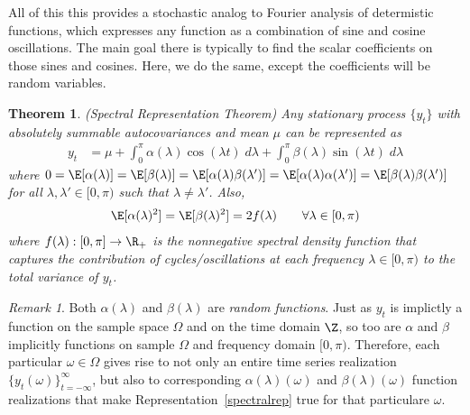 \documentclass[12pt]{article}
\theoremstyle{plain}
\newtheorem{thm}{Theorem}[section]
\theoremstyle{definition}
\theoremstyle{remark}
\newtheorem*{rmk}{Remark}
\newcommand{\ra}{\rightarrow}
\begin{document}
All of this this provides a stochastic analog to Fourier analysis of
determistic functions, which expresses any function as a combination of
sine and cosine oscillations. The main goal there is typically to find
the scalar coefficients on those sines and cosines. Here, we do the
same, except the coefficients will be random variables.

\begin{thm}\emph{(Spectral Representation Theorem)}
Any stationary process $\{y_t\}$ with absolutely summable
autocovariances and mean $\mu$ can be represented as
\begin{align}
  y_t &= \mu +
  \int_0^\pi \alpha(\lambda) \cos(\lambda t)\;d\lambda
  + \int_0^\pi \beta(\lambda) \sin(\lambda t)\;d\lambda
  \label{spectralrep}
\end{align}
where $0 = \E[\alpha(\lambda)] = \E[\beta(\lambda)] = \E[\alpha(\lambda)
\beta(\lambda')] \notag = \E[\alpha(\lambda)\alpha(\lambda')] =
\E[\beta(\lambda)\beta(\lambda')]$
for all $\lambda,\lambda' \in [0,\pi)$ such that $\lambda\neq\lambda'$.
Also,
\begin{align*}
    \E[\alpha(\lambda)^2] = \E[\beta(\lambda)^2] = 2f(\lambda)
    \qquad \forall \lambda \in [0,\pi)
\end{align*}
where $f(\lambda):[0,\pi]\ra \R_+$ is the nonnegative \emph{spectral
density function} that captures the contribution of cycles/oscillations
at each frequency $\lambda\in[0,\pi)$ to the total variance of $y_t$.
\end{thm}

\begin{rmk}
Both $\alpha(\lambda)$ and $\beta(\lambda)$ are \emph{random functions}.
Just as $y_t$ is implictly a function on the sample space $\Omega$ and
on the time domain $\Z$, so too are $\alpha$ and $\beta$ implicitly
functions on sample $\Omega$ and frequency domain $[0,\pi)$.
Therefore, each particular $\omega\in\Omega$ gives rise to not only an
entire time series realization $\{y_t(\omega)\}_{t=-\infty}^\infty$, but
also to corresponding $\alpha(\lambda)(\omega)$ and
$\beta(\lambda)(\omega)$ function realizations that make
Representation~\ref{spectralrep} true for that particulare
$\omega$.
\end{rmk}
\end{document}
